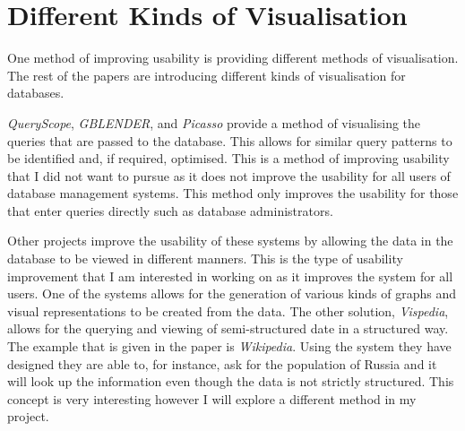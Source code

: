 \section{Different Kinds of Visualisation}

One method of improving usability is providing different methods of visualisation. The rest of the papers\cite{Hu2008,Haritsa2010,Yang2010,Jin2010,Chan2009} are introducing different kinds of visualisation for databases.

\emph{QueryScope}\cite{Hu2008}, \emph{GBLENDER}\cite{Jin2010}, and \emph{Picasso}\cite{Haritsa2010} provide a method of visualising the queries that are passed to the database. This allows for similar query patterns to be identified and, if required, optimised. This is a method of improving usability that I did not want to pursue as it does not improve the usability for all users of database management systems. This method only improves the usability for those that enter queries directly such as database administrators.

Other projects\cite{Yang2010,Chan2009} improve the usability of these systems by allowing the data in the database to be viewed in different manners. This is the type of usability improvement that I am interested in working on as it improves the system for all users. One of the systems\cite{Yang2010} allows for the generation of various kinds of graphs and visual representations to be created from the data. The other solution, \emph{Vispedia}\cite{Chan2009}, allows for the querying and viewing of semi-structured date in a structured way. The example that is given in the paper is \emph{Wikipedia}. Using the system they have designed they are able to, for instance, ask for the population of Russia and it will look up the information even though the data is not strictly structured. This concept is very interesting however I will explore a different method in my project.
